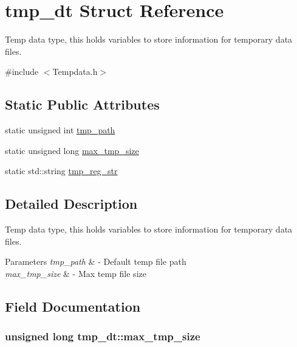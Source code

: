 \hypertarget{structtmp__dt}{}\section{tmp\+\_\+dt Struct Reference}
\label{structtmp__dt}


Temp data type, this holds variables to store information for temporary data files.  




{\ttfamily \#include $<$Tempdata.\+h$>$}

\subsection*{Static Public Attributes}
\begin{DoxyCompactItemize}
\item 
static unsigned int \hyperlink{structtmp__dt_a5133f5ea97efb23fde6f33ec7c8d454e}{tmp\+\_\+path}
\item 
static unsigned long \hyperlink{structtmp__dt_a08d502e4fb029c95ab90a50689dab4f0}{max\+\_\+tmp\+\_\+size}
\item 
static std\+::string \hyperlink{structtmp__dt_ae8a89114cd6dda550e3d1561f6fdc7a9}{tmp\+\_\+reg\+\_\+str}
\end{DoxyCompactItemize}


\subsection{Detailed Description}
Temp data type, this holds variables to store information for temporary data files. 


\begin{DoxyParams}{Parameters}
{\em tmp\+\_\+path} & -\/ Default temp file path \\
\hline
{\em max\+\_\+tmp\+\_\+size} & -\/ Max temp file size \\
\hline
\end{DoxyParams}


\subsection{Field Documentation}
\hypertarget{structtmp__dt_a08d502e4fb029c95ab90a50689dab4f0}{}
\subsubsection[{max\+\_\+tmp\+\_\+size}]{\setlength{\rightskip}{0pt plus 5cm}unsigned long tmp\+\_\+dt\+::max\+\_\+tmp\+\_\+size\hspace{0.3cm}{\ttfamily [static]}}\label{structtmp__dt_a08d502e4fb029c95ab90a50689dab4f0}
\hypertarget{structtmp__dt_a5133f5ea97efb23fde6f33ec7c8d454e}{}
